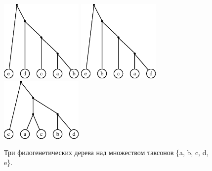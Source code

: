\begin{figure}[t]
  \centering
  \includegraphics[width=4cm]{img/inp1.eps}
  \hspace{5mm}
  \includegraphics[width=4cm]{img/inp2.eps}
  \hspace{5mm}
  \includegraphics[width=4cm]{img/inp3.eps}
  \caption{Три филогенетических дерева над множеством таксонов \{a, b, c, d, e\}.}
  \label{input-example}
\end{figure}

